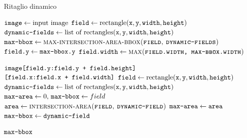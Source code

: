 \begin{algorithm}[H]
	\caption{Ritaglio dinamico}
	\label{alg:dynamic-cut}
	
	\begin{algorithmic}[1]
			\State $\texttt{image} \gets \text{input image}$
			\State $\texttt{field} \gets \text{rectangle} (\texttt{x}, \texttt{y}, \texttt{width}, \texttt{height})$
			\State $\texttt{dynamic-fields} \gets \text{list of rectangles} (\texttt{x}, \texttt{y}, \texttt{width}, \texttt{height})$
			\\
			\State $\vars{max-bbox} \gets \textproc{max-intersection-area-bbox(\vars{field}, \vars{dynamic-fields})}$
			\State $\texttt{field.y} \gets \texttt{max-bbox.y}$
			\State $\vars{field.width} \gets \textproc{max(\vars{field.width, max-bbox.width})}$

			\Return $\texttt{image[field.y:field.y + field.height]}$\newline\hspace*{2.91cm}
					$\texttt{[field.x:field.x + field.width]}$
		\EndFunction
		\Statex
			\State $\texttt{field} \gets \text{rectangle} (\texttt{x}, \texttt{y}, \texttt{width}, \texttt{height})$
			\State $\texttt{dynamic-fields} \gets \text{list of rectangles} (\texttt{x}, \texttt{y}, \texttt{width}, \texttt{height})$
			\\
			\State $\texttt{max-area} \gets 0\text{, } \texttt{max-bbox} \gets field$
				\State $\vars{area} \gets \textproc{intersection-area(\vars{field}, \vars{dynamic-field})}$
					\State $\texttt{max-area} \gets \texttt{area}$
					\State $\texttt{max-bbox} \gets \texttt{dynamic-field}$
				\EndIf
			\EndFor

			\Return $\texttt{max-bbox}$
		\EndFunction
	\end{algorithmic}
\end{algorithm}
